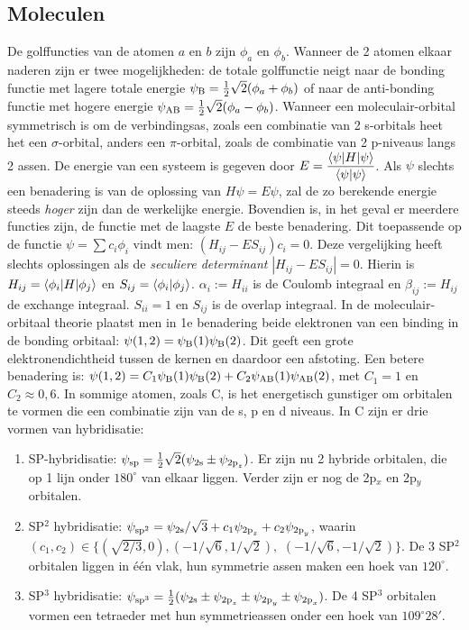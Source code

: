 \documentclass[twoside]{report}
\begin{document}
\subsection[~~Moleculen]{Moleculen}
De golffuncties van de atomen $a$ en $b$ zijn $\phi_a$ en $\phi_b$. Wanneer
de 2 atomen elkaar naderen zijn er twee mogelijkheden: de totale golffunctie
neigt naar de bonding functie met lagere totale energie
$\psi_{\rm B}=\mbox{$\frac{1}{2}$}\sqrt{2}(\phi_a+\phi_b)$ of naar de anti-bonding functie
met hogere energie $\psi_{\rm AB}=\mbox{$\frac{1}{2}$}\sqrt{2}(\phi_a-\phi_b)$. Wanneer
een moleculair-orbital symmetrisch is om de verbindingsas, zoals een
combinatie van 2 s-orbitals heet het een $\sigma$-orbital, anders een
$\pi$-orbital, zoals de combinatie van 2 p-niveaus langs 2 assen.
\npar
De energie van een systeem is gegeven door
$\displaystyle E=\frac{\left\langle \psi|H|\psi \right\rangle}{\left\langle \psi|\psi \right\rangle}$.
\npar
Als $\psi$ slechts een benadering is van de oplossing van $H\psi=E\psi$, zal
de zo berekende energie steeds {\it hoger} zijn dan de werkelijke energie.
Bovendien is, in het geval er meerdere functies zijn, de functie met de
laagste $E$ de beste benadering. Dit toepassende op de functie
$\psi=\sum c_i\phi_i$ vindt men: $(H_{ij}-ES_{ij})c_i=0$. Deze vergelijking
heeft slechts oplossingen als de {\it seculiere determinant}
$|H_{ij}-ES_{ij}|=0$. Hierin is $H_{ij}=\left\langle \phi_i|H|\phi_j \right\rangle$ en
$S_{ij}=\left\langle \phi_i|\phi_j \right\rangle$. $\alpha_i:=H_{ii}$ is de Coulomb integraal en
$\beta_{ij}:=H_{ij}$ de exchange integraal. $S_{ii}=1$ en $S_{ij}$ is de
overlap integraal.
\npar
In de moleculair-orbitaal theorie plaatst men in 1e benadering beide
elektronen van een binding in de bonding orbitaal:
$\psi(1,2)=\psi_{\rm B}(1)\psi_{\rm B}(2)$. Dit geeft een grote
elektronendichtheid tussen de kernen en daardoor een afstoting. Een betere
benadering is: $\psi(1,2)=C_1\psi_{\rm B}(1)\psi_{\rm B}(2)+C_2\psi_{\rm AB}(1)\psi_{\rm AB}(2)$,
met $C_1=1$ en $C_2\approx0,6$.
\npar
In sommige atomen, zoals C, is het energetisch gunstiger om orbitalen te
vormen die een combinatie zijn van de s, p en d niveaus. In C zijn er drie
vormen van hybridisatie:
\begin{enumerate}
\item SP-hybridisatie: $\psi_{\rm sp}=\mbox{$\frac{1}{2}$}\sqrt{2}(\psi_{\rm 2s}\pm\psi_{{\rm 2p}_z})$.
      Er zijn nu 2 hybride orbitalen, die op 1 lijn onder $180^\circ$ van
      elkaar liggen. Verder zijn er nog de 2p$_x$ en 2p$_y$ orbitalen.
\item SP$^2$ hybridisatie: $\psi_{\rm sp^2}=\psi_{\rm 2s}/\sqrt{3}+c_1\psi_{{\rm 2p}_z}+c_2\psi_{{\rm 2p}_y}$,
      waarin $(c_1,c_2)\in\{(\sqrt{2/3},0),(-1/\sqrt{6},1/\sqrt{2}),$ $(-1/\sqrt{6},-1/\sqrt{2})\}$.
      De 3 SP$^2$ orbitalen liggen in \'e\'en vlak, hun symmetrie assen maken
      een hoek van $120^\circ$.
\item SP$^3$ hybridisatie: $\psi_{\rm sp^3}=\mbox{$\frac{1}{2}$}(\psi_{\rm 2s}\pm\psi_{{\rm 2p}_z}\pm\psi_{{\rm 2p}_y}\pm\psi_{{\rm 2p}_x})$.
      De 4 SP$^3$ orbitalen vormen een tetraeder met hun symmetrieassen onder
      een hoek van $109^\circ 28'$.
\end{enumerate}
\end{document}
